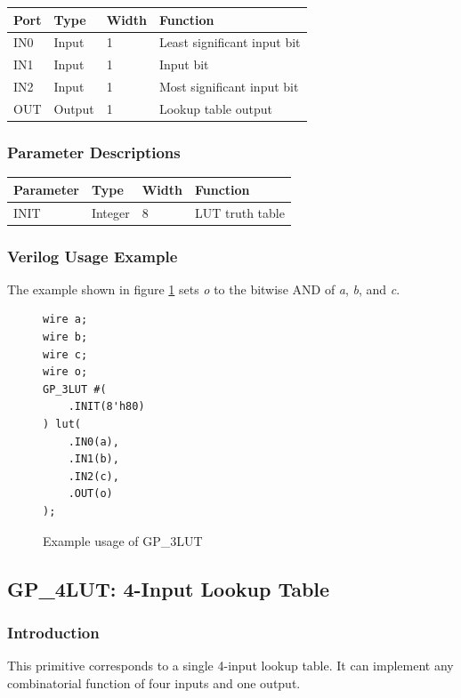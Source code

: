 \documentclass[11pt]{article}
\begin{document}
\begin{tabularx}{4in}{|l|l|l|X|}
\hline
{\bfseries Port} & {\bfseries Type} & {\bfseries Width} & {\bfseries Function} \\
\hline
IN0 & Input & 1 & Least significant input bit \\
\hline
IN1 & Input & 1 & Input bit \\
\hline
IN2 & Input & 1 & Most significant input bit \\
\hline
OUT & Output & 1 & Lookup table output \\
\hline
\end{tabularx}

\subsubsection{Parameter Descriptions}

\begin{tabularx}{4in}{|l|l|l|X|}
\hline
{\bfseries Parameter} & {\bfseries Type} & {\bfseries Width} & {\bfseries Function} \\
\hline
INIT & Integer & 8 & LUT truth table \\
\hline
\end{tabularx}

\subsubsection{Verilog Usage Example}

The example shown in figure \ref{gp-3LUT-example} sets \emph{o} to the bitwise AND of \emph{a}, \emph{b}, and \emph{c}.

\begin{figure}[h]
\begin{lstlisting}
wire a;
wire b;
wire c;
wire o;
GP_3LUT #(
	.INIT(8'h80)
) lut(
	.IN0(a),
	.IN1(b),
	.IN2(c),
	.OUT(o)
);
\end{lstlisting}
\caption{Example usage of GP\_3LUT}
\label{gp-3LUT-example}
\end{figure}


\pagebreak
\subsection{GP\_4LUT: 4-Input Lookup Table}

\subsubsection{Introduction}
This primitive corresponds to a single 4-input lookup table. It can implement any combinatorial function of four 
inputs and one output.
\end{document}
